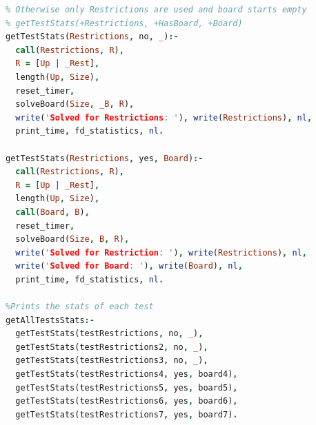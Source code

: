 \documentclass{llncs}
\begin{document}
\begin{lstlisting}[language=Prolog]
% Print stats for the given restricitons and the given, if HasBoard is 'yes'
% Otherwise only Restrictions are used and board starts empty
% getTestStats(+Restrictions, +HasBoard, +Board)
getTestStats(Restrictions, no, _):-
  call(Restrictions, R),
  R = [Up | _Rest],
  length(Up, Size),
  reset_timer,
  solveBoard(Size, _B, R),
  write('Solved for Restrictions: '), write(Restrictions), nl,
  print_time, fd_statistics, nl.

getTestStats(Restrictions, yes, Board):-
  call(Restrictions, R),
  R = [Up | _Rest],
  length(Up, Size),
  call(Board, B),
  reset_timer,
  solveBoard(Size, B, R),
  write('Solved for Restriction: '), write(Restrictions), nl,
  write('Solved for Board: '), write(Board), nl,
  print_time, fd_statistics, nl.

%Prints the stats of each test
getAllTestsStats:-
  getTestStats(testRestrictions, no, _),
  getTestStats(testRestrictions2, no, _),
  getTestStats(testRestrictions3, no, _),
  getTestStats(testRestrictions4, yes, board4),
  getTestStats(testRestrictions5, yes, board5),
  getTestStats(testRestrictions6, yes, board6),
  getTestStats(testRestrictions7, yes, board7).
\end{lstlisting}
\newpage
\end{document}

